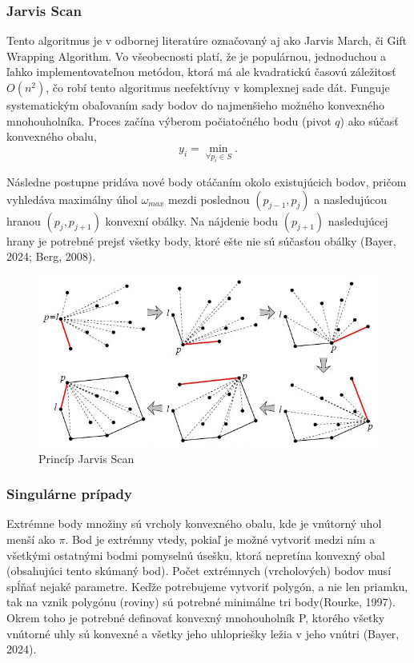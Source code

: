 \documentclass[12pt]{article}
\begin{document}
\subsubsection*{Jarvis Scan}
Tento algoritmus je v odbornej literatúre označovaný aj ako Jarvis March, či Gift Wrapping Algorithm. Vo všeobecnosti platí, že je populárnou, jednoduchou a ľahko implementovateľnou metódou, ktorá má ale kvadratickú časovú záležitosť \(O(n^2)\), čo robí tento algoritmus neefektívny v komplexnej sade dát. Funguje systematickým obaľovaním sady bodov do najmenšieho možného konvexného mnohouholníka. Proces začína výberom počiatočného bodu (pivot \(q\)) ako súčasť konvexného obalu, $$ y_i=\min\limits_{\forall p_i \in S} .$$ \par Následne postupne pridáva nové body otáčaním okolo existujúcich bodov, pričom vyhledáva maximálny úhol \(\omega_{max}\) mezdi poslednou \((p_{j-1}, p_j)\) a nasledujúcou hranou \((p_j, p_{j+1})\) konvexní obálky. Na nájdenie bodu  \((p_{j+1})\) nasledujúcej hrany je potrebné prejsť všetky body, ktoré ešte nie sú súčasťou obálky (Bayer, 2024; Berg, 2008).
\begin{figure}[h]
    \centering
    \includegraphics[width=0.6\linewidth]{latex/image/jarvis.jpg}
    \caption{Princíp Jarvis Scan}
    \label{fig:enter-label}
\end{figure}

\subsubsection*{Singulárne prípady}
Extrémne body množiny sú vrcholy konvexného obalu, kde je vnútorný uhol menší ako \( \pi \). Bod je extrémny vtedy, pokiaľ je možné vytvoriť medzi ním a všetkými ostatnými bodmi pomyselnú úsešku, ktorá nepretína konvexný obal (obsahujúci tento skúmaný bod). Počet extrémnych (vrcholových) bodov musí spĺňať nejaké parametre. Keďže potrebujeme vytvoriť polygón, a nie len priamku, tak na vznik polygónu (roviny) sú potrebné minimálne tri body(Rourke, 1997).
Okrem toho je potrebné definovať konvexný mnohouholník P, ktorého všetky vnútorné uhly sú konvexné a všetky jeho uhlopriešky ležia v jeho vnútri (Bayer, 2024).
\end{document}
